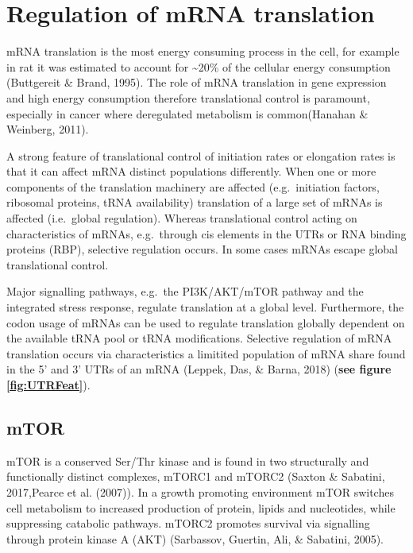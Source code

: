 \documentclass[12pt,openany]{book}
\begin{document}
\section{Regulation of mRNA translation} \label{regmRNA}

mRNA translation is the most energy consuming process in the cell, for
example in rat it was estimated to account for \textasciitilde{}20\% of
the cellular energy consumption (Buttgereit \& Brand, 1995). The role of
mRNA translation in gene expression and high energy consumption
therefore translational control is paramount, especially in cancer where
deregulated metabolism is common(Hanahan \& Weinberg, 2011).

A strong feature of translational control of initiation rates or
elongation rates is that it can affect mRNA distinct populations
differently. When one or more components of the translation machinery
are affected (e.g.~initiation factors, ribosomal proteins, tRNA
availability) translation of a large set of mRNAs is affected
(i.e.~global regulation). Whereas translational control acting on
characteristics of mRNAs, e.g.~through cis elements in the UTRs or RNA
binding proteins (RBP), selective regulation occurs. In some cases mRNAs
escape global translational control.

Major signalling pathways, e.g.~the PI3K/AKT/mTOR pathway and the
integrated stress response, regulate translation at a global level.
Furthermore, the codon usage of mRNAs can be used to regulate
translation globally dependent on the available tRNA pool or tRNA
modifications. Selective regulation of mRNA translation occurs via
characteristics a limitited population of mRNA share found in the 5' and
3' UTRs of an mRNA (Leppek, Das, \& Barna, 2018) (\textbf{see figure
\ref{fig:UTRFeat}}).

\subsection{mTOR} \label{mTOR}

mTOR is a conserved Ser/Thr kinase and is found in two structurally and
functionally distinct complexes, mTORC1 and mTORC2 (Saxton \& Sabatini,
2017,Pearce et al. (2007)). In a growth promoting environment mTOR
switches cell metabolism to increased production of protein, lipids and
nucleotides, while suppressing catabolic pathways. mTORC2 promotes
survival via signalling through protein kinase A (AKT) (Sarbassov,
Guertin, Ali, \& Sabatini, 2005).
\end{document}
